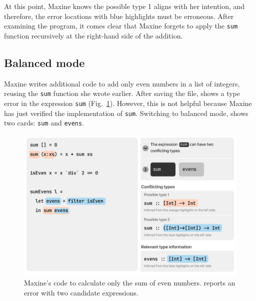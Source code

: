 





At this point, Maxine knows the possible type 1 aligns with her intention, and therefore, the error locations with blue highlights must be erroneous. After examining the program, it comes clear that Maxine forgets to apply the \texttt{sum} function recursively at the right-hand side of the addition. 


\subsection{Balanced mode} \label{sub:balanced}


Maxine writes additional code to add only even numbers in a list of integers, reusing the \texttt{sum} function she wrote earlier. After saving the file, \chameleon{} shows a type error in the expression \texttt{sum} (Fig.~\ref{fig:balance-mode-1}). However, this is not helpful because Maxine has just verified the implementation of \texttt{sum}. Switching to balanced mode, \chameleon{} shows two cards: \texttt{sum} and \texttt{evens}. 

\begin{figure}
        \centering
        \includegraphics[width=\linewidth,trim=0mm 8mm 0mm 0mm]{images/balanced-mode-1.pdf}
        \caption{
            Maxine's code to calculate only the sum 
            of even numbers. \chameleon{} reports 
            an error with two candidate expressions.
        }
        \label{fig:balance-mode-1}
\end{figure}


